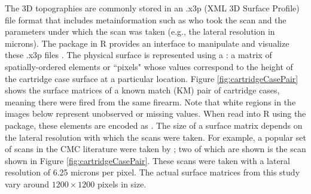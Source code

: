 The 3D topographies are commonly stored in an .x3p (XML 3D Surface
Profile) file format that includes metainformation such as who took the
scan and the parameters under which the scan was taken (e.g., the
lateral resolution in microns). The  package in R provides
an interface to manipulate and visualize these .x3p files
\citep{x3ptools}. The physical surface is represented using a
: a matrix of spatially-ordered elements or
``pixels" whose values correspond to the height of the cartridge case
surface at a particular location. Figure \ref{fig:cartridgeCasePair}
shows the surface matrices of a known match (KM) pair of cartridge
cases, meaning there were fired from the same firearm. Note that white
regions in the images below represent unobserved or missing values. When
read into R using the  package, these elements are encoded
as . The size of a surface matrix depends on the lateral
resolution with which the scans were taken. For example, a popular set
of scans in the CMC literature were taken by
\citet{fadul_empirical_nodate}; two of which are shown is the scan shown
in Figure \ref{fig:cartridgeCasePair}. These scans were taken with a
lateral resolution of 6.25 microns per pixel. The actual surface
matrices from this study vary around \(1200 \times 1200\) pixels in
size.

